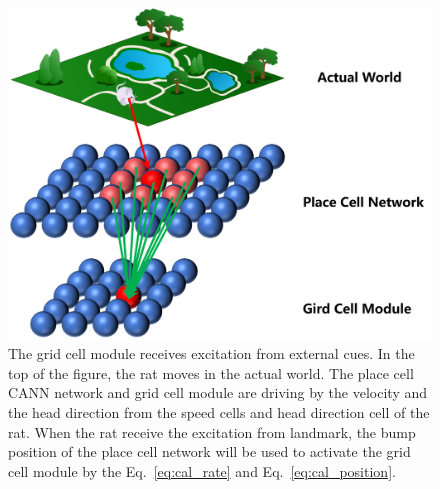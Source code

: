 \documentclass[preprint,12pt]{elsarticle}
\begin{document}
\begin{figure}[!t]
	\centering
	\includegraphics[width=0.9\linewidth]{Figure/w-p-g.png}
	\caption{The grid cell module receives excitation from external cues. In the top of the figure, the rat moves in the actual world. The place cell CANN network and grid cell module are driving by the velocity and the head direction from the speed cells and head direction cell of the rat. When the rat receive the excitation from landmark, the bump position of the place cell network will be used to activate the grid cell module by the Eq.~\eqref{eq:cal_rate} and Eq.~\eqref{eq:cal_position}.}
	\label{fig:w2p2g}
\end{figure}
\end{document}

